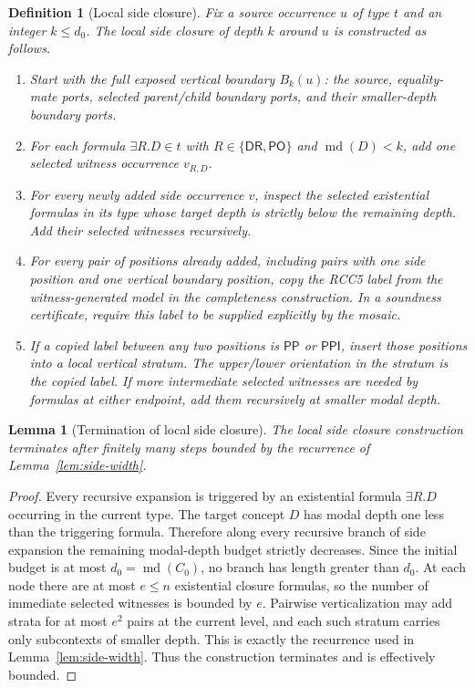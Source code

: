 \documentclass[11pt]{article}
\newtheorem{lemma}[theorem]{Lemma}
\newtheorem{definition}[theorem]{Definition}
\newcommand{\DR}{\mathsf{DR}}
\newcommand{\PO}{\mathsf{PO}}
\newcommand{\PP}{\mathsf{PP}}
\newcommand{\PPI}{\mathsf{PPI}}
\newcommand{\md}{\operatorname{md}}
\begin{document}
\begin{definition}[Local side closure]
Fix a source occurrence $u$ of type $t$ and an integer $k\le d_0$.  The local side closure of depth $k$ around $u$ is constructed as follows.
\begin{enumerate}[label=(LC\arabic*)]
\item Start with the full exposed vertical boundary $B_k(u)$: the source, equality-mate ports, selected parent/child boundary ports, and their smaller-depth boundary ports.
\item For each formula $\exists R.D\in t$ with $R\in\{\DR,\PO\}$ and $\md(D)<k$, add one selected witness occurrence $v_{R,D}$.
\item For every newly added side occurrence $v$, inspect the selected existential formulas in its type whose target depth is strictly below the remaining depth.  Add their selected witnesses recursively.
\item For every pair of positions already added, including pairs with one side position and one vertical boundary position, copy the RCC5 label from the witness-generated model in the completeness construction.  In a soundness certificate, require this label to be supplied explicitly by the mosaic.
\item If a copied label between any two positions is $\PP$ or $\PPI$, insert those positions into a local vertical stratum.  The upper/lower orientation in the stratum is the copied label.  If more intermediate selected witnesses are needed by formulas at either endpoint, add them recursively at smaller modal depth.
\end{enumerate}
\end{definition}

\begin{lemma}[Termination of local side closure]
The local side closure construction terminates after finitely many steps bounded by the recurrence of Lemma~\ref{lem:side-width}.
\end{lemma}

\begin{proof}
Every recursive expansion is triggered by an existential formula $\exists R.D$ occurring in the current type.  The target concept $D$ has modal depth one less than the triggering formula.  Therefore along every recursive branch of side expansion the remaining modal-depth budget strictly decreases.  Since the initial budget is at most $d_0=\md(C_0)$, no branch has length greater than $d_0$.  At each node there are at most $e\le n$ existential closure formulas, so the number of immediate selected witnesses is bounded by $e$.  Pairwise verticalization may add strata for at most $e^2$ pairs at the current level, and each such stratum carries only subcontexts of smaller depth.  This is exactly the recurrence used in Lemma~\ref{lem:side-width}.  Thus the construction terminates and is effectively bounded.
\end{proof}
\end{document}
